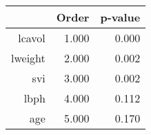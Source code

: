 \begin{table}[ht]
\centering
\begin{tabular}{rrr}
  \hline
 & Order & p-value \\ 
  \hline
lcavol & 1.000 & 0.000 \\ 
  lweight & 2.000 & 0.002 \\ 
  svi & 3.000 & 0.002 \\ 
  lbph & 4.000 & 0.112 \\ 
  age & 5.000 & 0.170 \\ 
   \hline
\end{tabular}
\end{table}
